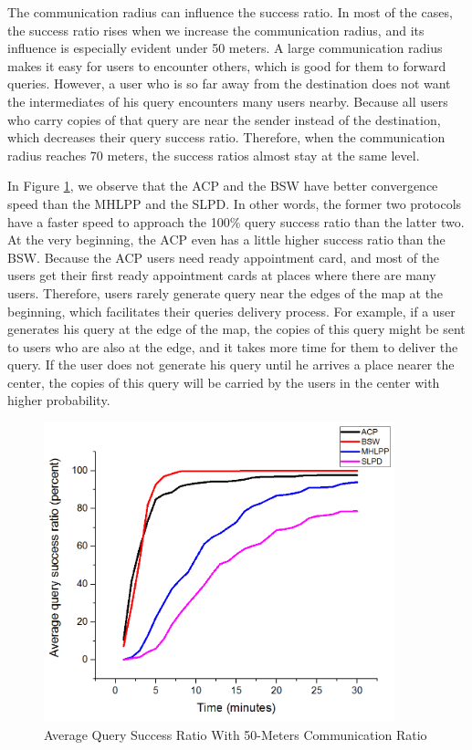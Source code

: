The communication radius can influence the success ratio. In most of the cases, the success ratio rises when we increase the communication radius, and its influence is especially evident under 50 meters. A large communication radius makes it easy for users to encounter others, which is good for them to forward queries. However, a user who is so far away from the destination does not want the intermediates of his query encounters many users nearby. Because all users who carry copies of that query are near the sender instead of the destination, which decreases their query success ratio. Therefore, when the communication radius reaches 70 meters, the success ratios almost stay at the same level.

In Figure \ref{fig:F416AverageQuerySuccessRatioWith50MetersCommunicationRatio}, we observe that the ACP and the BSW have better convergence speed than the MHLPP and the SLPD. In other words, the former two protocols have a faster speed to approach the 100\% query success ratio than the latter two. At the very beginning, the ACP even has a little higher success ratio than the BSW. Because the ACP users need ready appointment card, and most of the users get their first ready appointment cards at places where there are many users. Therefore, users rarely generate query near the edges of the map at the beginning, which facilitates their queries delivery process. For example, if a user generates his query at the edge of the map, the copies of this query might be sent to users who are also at the edge, and it takes more time for them to deliver the query. If the user does not generate his query until he arrives a place nearer the center, the copies of this query will be carried by the users in the center with higher probability.

\begin{figure} [hbtp]
  \centering 
  \includegraphics[width=4.0in]{figures/F416AverageQuerySuccessRatioWith50MetersCommunicationRatio.png}
  \caption{Average Query Success Ratio With 50-Meters Communication Ratio} 
  \label{fig:F416AverageQuerySuccessRatioWith50MetersCommunicationRatio} %
\end{figure}

